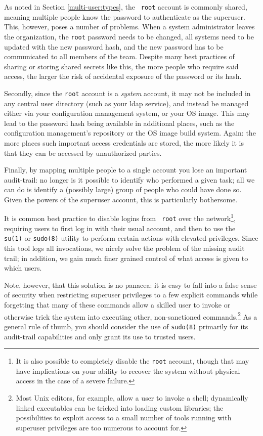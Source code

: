 As noted in Section \ref{multi-user:types}, the {\tt
root} account is commonly shared, meaning multiple
people know the password to authenticate as the
superuser.  This, however, poses a number of problems.
When a system administrator leaves the organization,
the {\tt root} password needs to be changed, all
systems need to be updated with the new password hash,
and the new password has to be communicated to all
members of the team.  Despite many best practices of
sharing or storing shared secrets like this, the more
people who require said access, the larger the risk of
accidental exposure of the password or its hash.

Secondly, since the {\tt root} account is a {\em
system} account, it may not be included in any central
user directory (such as your \gls{ldap} service), and
instead be managed either via your configuration
management system, or your OS image.  This may lead to
the password hash being available in additional
places, such as the configuration management's
repository or the OS image build system.  Again: the
more places such important access credentials are
stored, the more likely it is that they can be
accessed by unauthorized parties.

Finally, by mapping multiple people to a single
account you lose an important audit-trail: no longer
is it possible to identify who performed a given task;
all we can do is identify a (possibly large) group of
people who could have done so.  Given the powers of
the superuser account, this is particularly
bothersome.

It is common best practice to disable logins from {\tt
root} over the network\footnote{It is also possible to
completely disable the {\tt root} account, though that
may have implications on your ability to recover the
system without physical access in the case of a severe
failure.}, requiring users to first log in with their
usual account, and then to use the {\tt
su(1)} or {\tt sudo(8)} utility to perform certain actions with
elevated privileges. Since this tool logs all
invocations, we nicely solve the problem of the
missing audit trail; in addition, we gain much finer
grained control of what access is given to which
users.

Note, however, that this solution is no panacea: it is
easy to fall into a false sense of security when
restricting superuser privileges to a few explicit
commands while forgetting that many of these commands
allow a skilled user to invoke or otherwise trick the
system into executing other, non-sanctioned
commands.\footnote{Most Unix editors, for example,
allow a user to invoke a shell; dynamically linked
executables can be tricked into loading custom
libraries; the possibilities to exploit access to a
small number of tools running with superuser
privileges are too numerous to account for.}  As a
general rule of thumb, you should consider the use of
{\tt sudo(8)} primarily for its audit-trail
capabilities and only grant its use to trusted users.

